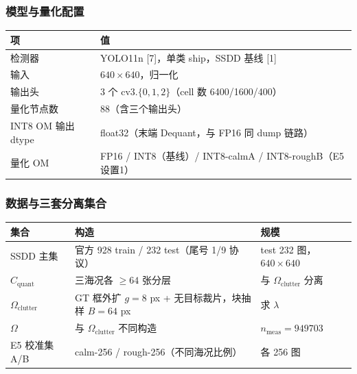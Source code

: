 \subsubsection{模型与量化配置}\label{ux6a21ux578bux4e0eux91cfux5316ux914dux7f6e}

{\def\LTcaptype{none} %
\begin{longtable}[]{@{}ll@{}}
\toprule\noalign{}
项 & 值 \\
\midrule\noalign{}
\endhead
\bottomrule\noalign{}
\endlastfoot
检测器 & YOLO11n {[}7{]}，单类 ship，SSDD 基线 {[}1{]} \\
输入 & \(640{\times}640\)，归一化 \\
输出头 & 3 个 \(\mathrm{cv3}.\{0,1,2\}\)（cell 数 6400/1600/400） \\
量化节点数 & 88（含三个输出头） \\
INT8 OM 输出 dtype & float32（末端 Dequant，与 FP16 同 dump 链路） \\
量化 OM & FP16 / INT8（基线）/ INT8-calmA / INT8-roughB（E5 设置1） \\
\end{longtable}
}

\subsubsection{数据与三套分离集合}\label{ux6570ux636eux4e0eux4e09ux5957ux5206ux79bbux96c6ux5408}

{\def\LTcaptype{none} %
\begin{longtable}[]{@{}
  >{\raggedright\arraybackslash}p{}
  >{\raggedright\arraybackslash}p{}
  >{\raggedright\arraybackslash}p{}@{}}
\toprule\noalign{}
\begin{minipage}[b]{\linewidth}\raggedright
集合
\end{minipage} & \begin{minipage}[b]{\linewidth}\raggedright
构造
\end{minipage} & \begin{minipage}[b]{\linewidth}\raggedright
规模
\end{minipage} \\
\midrule\noalign{}
\endhead
\bottomrule\noalign{}
\endlastfoot
SSDD 主集 & 官方 928 train / 232 test（尾号 1/9 协议） & test 232
图，\(640{\times}640\) \\
\(C_{\mathrm{quant}}\) & 三海况各 \(\ge 64\) 张分层 & 与
\(\Omega_{\mathrm{clutter}}\) 分离 \\
\(\Omega_{\mathrm{clutter}}\) & GT 框外扩 \(g{=}8\) px +
无目标裁片，块抽样 \(B{=}64\) px & 求 \(\lambda\) \\
\(\Omega\) & 与 \(\Omega_{\mathrm{clutter}}\) 不同构造 &
\(n_{\mathrm{meas}}=949703\) \\
E5 校准集 A/B & calm-256 / rough-256（不同海况比例） & 各 256 图 \\
\end{longtable}
}


